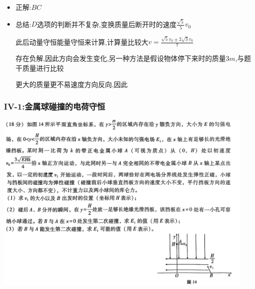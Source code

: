 \documentclass{article}
\begin{document}
\begin{itemize}
    \item 正解:\quad $BC$
    \item 总结:\quad $D$选项的判断并不复杂,变换质量后断开时的速度$\frac{\sqrt{5}}{5} v_{0}$

          \hspace{2.7em}此后动量守恒能量守恒来计算,计算量比较大$v = \frac{\sqrt{5}v_{0} \pm 2\sqrt{3}v_{0}}{7}$

          \hspace{2.7em}存在负解,因此方向会发生变化,另一种方法是假设物体停下来时的质量$3m$,与题干质量进行比较

          \hspace{2.7em}更大的质量更不易速度方向反向,因此
\end{itemize}

\vspace{2em}

\subsubsection{IV-1:金属球碰撞的电荷守恒}
\includegraphics[width=0.95\textwidth,keepaspectratio]{./pictures/3.8-2.png}
\end{document}
